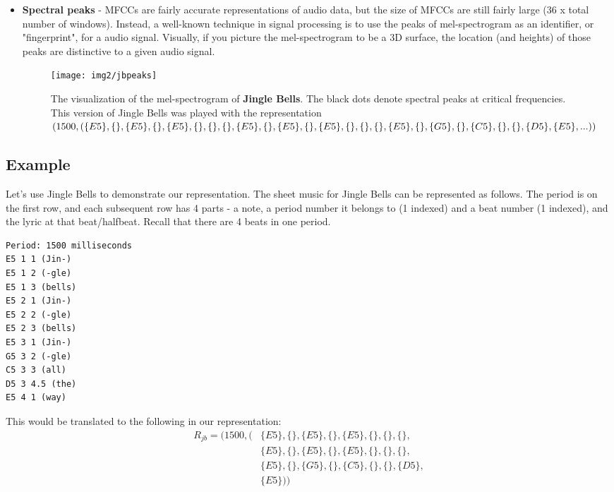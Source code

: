 \documentclass{pnastwo}
\begin{document}
\begin{article}
\begin{itemize}
 \item \textbf{Spectral peaks} - MFCCs are fairly accurate representations of audio data, but the size of MFCCs are still fairly large (36 x total number of windows). Instead, a well-known technique in signal processing is to use the peaks of mel-spectrogram as an identifier, or "fingerprint", for a audio signal. Visually, if you picture the mel-spectrogram to be a 3D surface, the location (and heights) of those peaks are distinctive to a given audio signal. 
\begin{figure}
\centerline{\texttt{[image: img2/jbpeaks]}}
\caption{The visualization of the mel-spectrogram of \textbf{Jingle Bells}. The black dots denote spectral peaks at critical frequencies. This version of Jingle Bells was played with the representation $(1500, (\{E5\}, \{\},  \{E5\}, \{\}, \{E5\}, \{\}, \{\}, \{\}, \{E5\}, \{\}, \{E5\}, \{\}, \{E5\},  \\ \{\}, \{\}, \{\}, \{E5\}, \{\}, \{G5\}, \{\}, \{C5\}, \{\}, \{\}, \{D5\}, \{E5\}, ...) )$}\label{fig5}
\end{figure}
\end{itemize}



\subsection{Example}
Let's use Jingle Bells to demonstrate our representation. The sheet music for Jingle Bells can be represented as follows. The period is on the first row, and each subsequent row has 4 parts - a note, a period number it belongs to (1 indexed) and a beat number (1 indexed), and the lyric at that beat/halfbeat. Recall that there are 4 beats in one period. 
\begin{verbatim}
Period: 1500 milliseconds
E5 1 1 (Jin-)
E5 1 2 (-gle)
E5 1 3 (bells)
E5 2 1 (Jin-)
E5 2 2 (-gle)
E5 2 3 (bells)
E5 3 1 (Jin-)
G5 3 2 (-gle)
C5 3 3 (all)
D5 3 4.5 (the)
E5 4 1 (way)
\end{verbatim}

This would be translated to the following in our representation:
\begin{align*}
R_{jb} =  (1500,( & \{E5\}, \{\},  \{E5\}, \{\}, \{E5\}, \{\}, \{\}, \{\},  \\
& \{E5\}, \{\}, \{E5\}, \{\}, \{E5\}, \{\}, \{\}, \{\},\\
&  \{E5\}, \{\}, \{G5\}, \{\}, \{C5\}, \{\}, \{\}, \{D5\}, \\
& \{E5\})  )
\end{align*}


\end{article}
\end{document}

